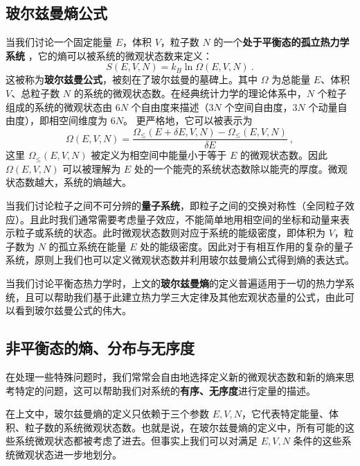 

\subsection{玻尔兹曼熵公式} 
当我们讨论一个固定能量 $E$，体积 $V$，粒子数 $N$ 的一个\textbf{处于平衡态的孤立热力学系统} ，它的熵可以被系统的微观状态数来定义：
\begin{equation}
S(E,V,N) = k_B \ln \Omega(E,V,N)~.
\end{equation}
这被称为\textbf{玻尔兹曼公式}，被刻在了玻尔兹曼的墓碑上。其中 $\Omega$ 为总能量 $E$、体积 $V$、总粒子数 $N$ 的系统的微观状态数。在经典统计力学的理论体系中，$N$ 个粒子组成的系统的微观状态由 $6N$ 个自由度来描述（$3N$ 个空间自由度，$3N$ 个动量自由度），即相空间维度为 $6N$。
更严格地，它可以被表示为
\begin{equation}\label{eq_entro2_1}
\Omega(E,V,N)=\frac{\Omega_{\le}(E+\delta E,V,N)-\Omega_{\le}(E,V,N)}{\delta E}~,
\end{equation}
这里 $\Omega_{\le}(E,V,N)$ 被定义为相空间中能量小于等于 $E$ 的微观状态数。因此 $\Omega(E,V,N)$ 可以被理解为 $E$ 处的一个能壳的系统状态数除以能壳的厚度。微观状态数越大，系统的熵越大。

当我们讨论粒子之间不可分辨的\textbf{量子系统}，即粒子之间的交换对称性（全同粒子效应）。且此时我们通常需要考虑量子效应，不能简单地用相空间的坐标和动量来表示粒子或系统的状态。此时微观状态数则对应于系统的能级密度，即体积为 $V$，粒子数为 $N$ 的孤立系统在能量 $E$ 处的能级密度。因此对于有相互作用的复杂的量子系统，原则上我们也可以定义微观状态数并利用玻尔兹曼熵公式得到熵的表达式。

当我们讨论平衡态热力学时，上文的\textbf{玻尔兹曼熵}的定义普遍适用于一切的热力学系统，且可以帮助我们基于此建立热力学三大定律及其他宏观状态量的公式，由此可以看到玻尔兹曼公式的伟大。
\subsection{非平衡态的熵、分布与无序度}
在处理一些特殊问题时，我们常常会自由地选择定义新的微观状态数和新的熵来思考特定的问题，这可以帮助我们对系统的\textbf{有序、无序度}进行定量的描述。

在上文中，玻尔兹曼熵的定义只依赖于三个参数 $E,V,N$，它代表特定能量、体积、粒子数的系统微观状态数。也就是说，在玻尔兹曼熵的定义中，所有可能的这些系统微观状态都被考虑了进去。但事实上我们可以对满足 $E,V,N$ 条件的这些系统微观状态进一步地划分。

